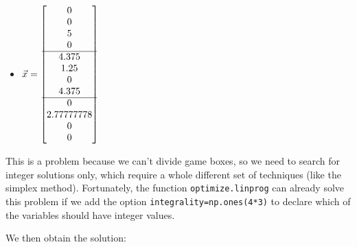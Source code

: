 \begin{enumerate}
\begin{minipage}{.3\textwidth}
\begin{itemize}
	\item $\vec{x} = \begin{bmatrix} 0 \\ 0 \\ 5 \\ 0 \\\hline 4.375 \\ 1.25 \\ 0 \\ 4.375 \\\hline 0 \\ 2.77777778 \\ 0 \\ 0 \end{bmatrix}$
\end{itemize}	
\end{minipage}
\hfill \begin{minipage}{.6\textwidth}
This is a problem because we can't divide game boxes, so we need to search for integer solutions only, which require a whole different set of techniques (like the simplex method). 
Fortunately, the function \texttt{optimize.linprog} can already solve this problem if we add the option \texttt{integrality=np.ones(4*3)} to declare which of the variables should have integer values.	
\end{minipage}

We then obtain the solution:


\end{enumerate}
